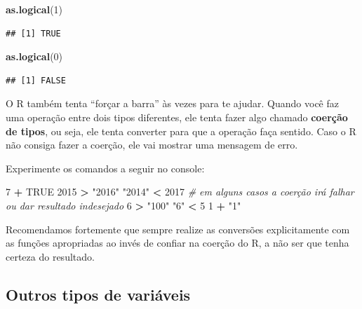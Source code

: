 \documentclass[]{book}
\newenvironment{Shaded}{\begin{snugshade}}{\end{snugshade}}
\newcommand{\KeywordTok}[1]{\textcolor[rgb]{0.13,0.29,0.53}{\textbf{#1}}}
\newcommand{\DecValTok}[1]{\textcolor[rgb]{0.00,0.00,0.81}{#1}}
\newcommand{\StringTok}[1]{\textcolor[rgb]{0.31,0.60,0.02}{#1}}
\newcommand{\CommentTok}[1]{\textcolor[rgb]{0.56,0.35,0.01}{\textit{#1}}}
\newcommand{\OtherTok}[1]{\textcolor[rgb]{0.56,0.35,0.01}{#1}}
\newcommand{\OperatorTok}[1]{\textcolor[rgb]{0.81,0.36,0.00}{\textbf{#1}}}
\newcommand{\NormalTok}[1]{#1}
\begin{document}
\begin{Shaded}
\begin{Highlighting}[]
\KeywordTok{as.logical}\NormalTok{(}\DecValTok{1}\NormalTok{)}
\end{Highlighting}
\end{Shaded}

\begin{verbatim}
## [1] TRUE
\end{verbatim}

\begin{Shaded}
\begin{Highlighting}[]
\KeywordTok{as.logical}\NormalTok{(}\DecValTok{0}\NormalTok{)}
\end{Highlighting}
\end{Shaded}

\begin{verbatim}
## [1] FALSE
\end{verbatim}

O R também tenta ``forçar a barra'' às vezes para te ajudar. Quando você
faz uma operação entre dois tipos diferentes, ele tenta fazer algo
chamado \textbf{coerção de tipos}, ou seja, ele tenta converter para que
a operação faça sentido. Caso o R não consiga fazer a coerção, ele vai
mostrar uma mensagem de erro.

Experimente os comandos a seguir no console:

\begin{Shaded}
\begin{Highlighting}[]
\DecValTok{7} \OperatorTok{+}\StringTok{ }\OtherTok{TRUE}
\DecValTok{2015} \OperatorTok{>}\StringTok{ "2016"}
\StringTok{"2014"} \OperatorTok{<}\StringTok{ }\DecValTok{2017}
\CommentTok{# em alguns casos a coerção irá falhar ou dar resultado indesejado}
\DecValTok{6} \OperatorTok{>}\StringTok{ "100"}
\StringTok{"6"} \OperatorTok{<}\StringTok{ }\DecValTok{5}
\DecValTok{1} \OperatorTok{+}\StringTok{ "1"}
\end{Highlighting}
\end{Shaded}

Recomendamos fortemente que sempre realize as conversões explicitamente
com as funções apropriadas ao invés de confiar na coerção do R, a não
ser que tenha certeza do resultado.

\subsection{Outros tipos de variáveis}\label{outros-tipos-de-variaveis}
\end{document}
